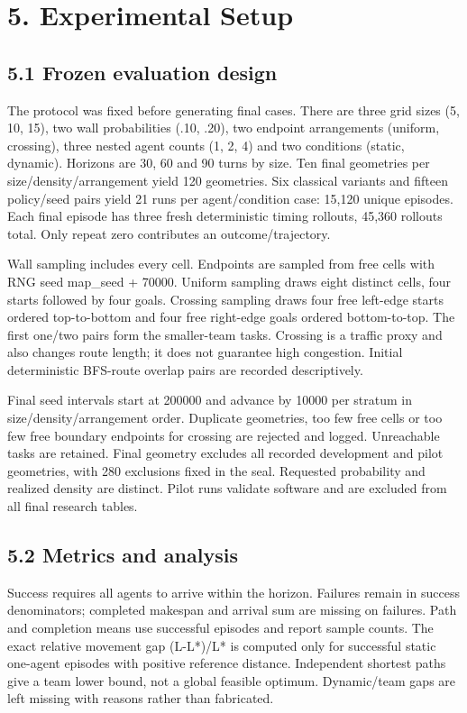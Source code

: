 \documentclass[10pt,a4paper]{article}
\begin{document}
\section*{5. Experimental Setup}

\subsection*{5.1 Frozen evaluation design}

The protocol was fixed before generating final cases. There are three grid
sizes (5, 10, 15), two wall probabilities (.10, .20), two endpoint arrangements
(uniform, crossing), three nested agent counts (1, 2, 4) and two conditions
(static, dynamic). Horizons are 30, 60 and 90 turns by size. Ten final geometries
per size/density/arrangement yield 120 geometries. Six classical variants and
fifteen policy/seed pairs yield 21 runs per agent/condition case: 15,120 unique
episodes. Each final episode has three fresh deterministic timing rollouts,
45,360 rollouts total. Only repeat zero contributes an outcome/trajectory.

Wall sampling includes every cell. Endpoints are sampled from free cells with
RNG seed map\_seed + 70000. Uniform sampling draws eight distinct cells, four
starts followed by four goals. Crossing sampling draws four free left-edge
starts ordered top-to-bottom and four free right-edge goals ordered bottom-to-top.
The first one/two pairs form the smaller-team tasks. Crossing is a traffic
proxy and also changes route length; it does not guarantee high congestion.
Initial deterministic BFS-route overlap pairs are recorded descriptively.

Final seed intervals start at 200000 and advance by 10000 per stratum in
size/density/arrangement order. Duplicate geometries, too few free cells or too
few free boundary endpoints for crossing are rejected and logged. Unreachable
tasks are retained. Final geometry excludes all recorded development and pilot
geometries, with 280 exclusions fixed in the seal. Requested probability and
realized density are distinct. Pilot runs validate software and are excluded
from all final research tables.

\subsection*{5.2 Metrics and analysis}

Success requires all agents to arrive within the horizon. Failures remain in
success denominators; completed makespan and arrival sum are missing on failures.
Path and completion means use successful episodes and report sample counts.
The exact relative movement gap (L-L*)/L* is computed only for successful static
one-agent episodes with positive reference distance. Independent shortest paths
give a team lower bound, not a global feasible optimum. Dynamic/team gaps are
left missing with reasons rather than fabricated.
\end{document}
